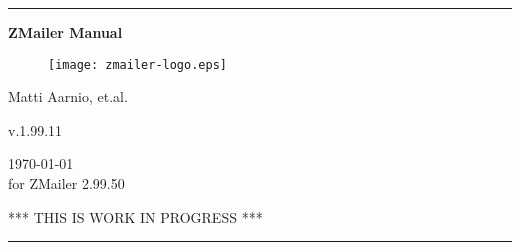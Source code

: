 \documentclass[twoside,twocolumn,a4paper,draft]{book}
\newcommand{\ZMailerManual}{ZMailer Manual}
\newcommand{\ZManVersion}{v.1.99.11}
\begin{document}
\startdocument

\begin{titlepage}
\rule{\textwidth}{1mm}
\begin{center}
\bf
\Huge
\vspace{2ex}
\ZMailerManual \\
\vspace{2ex}

\begin{htmlonly}
\end{htmlonly}

\begin{figure}[h]
  \texttt{[image: zmailer-logo.eps]}
\end{figure}
\vspace{2ex}

\Large
Matti Aarnio, et.al. \\
\vspace{2ex}
\begin{htmlonly}
\vspace{1ex}
\end{htmlonly}
\ZManVersion \\
\date \\
\today \\
for ZMailer 2.99.50 \\
\vspace{2ex}
\begin{htmlonly}
\vspace{1ex}
\end{htmlonly}
\Large
\sf
*** THIS IS WORK IN PROGRESS ***
\end{center}
\vfill
\rule{\textwidth}{1mm}
\end{titlepage}

\cleardoublepage


%
\end{document}
